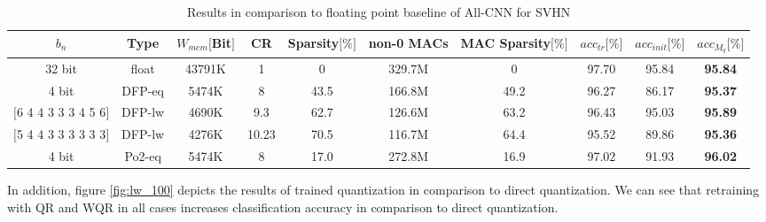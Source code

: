 \begin{table}[ht!]
  \caption{Results in comparison to floating point baseline of All-CNN for SVHN}
  \label{tab:res_SVHN}
  \begin{tabular}{cc|ccc|cc|ccc}
\hline
    	$b_n$&Type&$W_{mem}\lbrack$Bit$\rbrack$&CR& Sparsity$\lbrack\%\rbrack$ & non-0 MACs & MAC Sparsity$\lbrack\%\rbrack$ & $acc_{tr}\lbrack\%\rbrack$ & $acc_{init}\lbrack\%\rbrack$ & $acc_{M_q}\lbrack\%\rbrack$\\
\hline
 		32 bit & float & 43791K & 1 & 0 & 329.7M & 0 & 97.70 & 95.84 & \textbf{95.84} \\
\hline
 		4 bit & DFP-eq & 5474K & 8 & 43.5 & 166.8M & 49.2 & 96.27 & 86.17 & \textbf{95.37}\\
\hline
 		$\lbrack$6 4 4 3 3 3 4 5 6$\rbrack$ & DFP-lw &4690K& 9.3&62.7&126.6M&63.2&96.43&95.03&\textbf{95.89}\\
         $\lbrack$5 4 4 3 3 3 3 3 3$\rbrack$ & DFP-lw &4276K& 10.23&70.5&116.7M&64.4&95.52&89.86&\textbf{95.36}\\
\hline
 		4 bit & Po2-eq & 5474K & 8 & 17.0 & 272.8M & 16.9  &97.02&91.93&\textbf{96.02}\\
\hline
\end{tabular}
\end{table}



In addition, figure \ref{fig:lw_100} depicts the results of trained quantization in comparison to direct quantization. We can see that retraining with QR and WQR in all cases increases classification accuracy in comparison to direct quantization.

